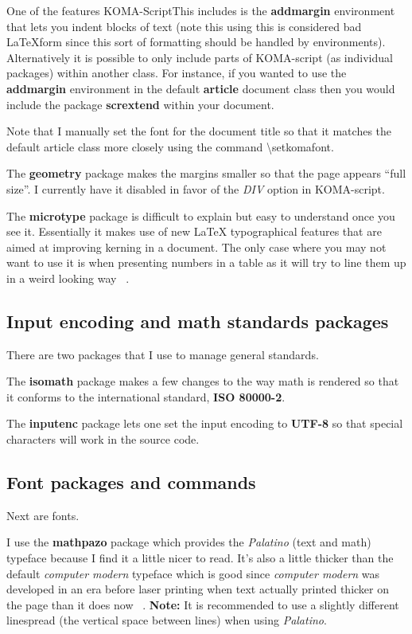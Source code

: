       One of the features KOMA-ScriptThis includes is the \textbf{addmargin} environment that lets you indent blocks of text (note this using this is considered bad \LaTeX form since this sort of formatting should be handled by environments). Alternatively it is possible to only include parts of KOMA-script (as individual packages) within another class. For instance, if you wanted to use the \textbf{addmargin} environment in the default \textbf{article} document class then you would include the package \textbf{scrextend} within your document.

      Note that I manually set the font for the document title so that it matches the default article class more closely using the command \textbackslash setkomafont.

      The \textbf{geometry} package makes the margins smaller so that the page appears ``full size''. I currently have it disabled in favor of the \textit{DIV} option in KOMA-script.

      The \textbf{microtype} package is difficult to explain but easy to understand once you see it. Essentially it makes use of new \LaTeX{} typographical features that are aimed at improving kerning in a document. The only case where you may not want to use it is when presenting numbers in a table as it will try to line them up in a weird looking way ~\cite{Khirevich}.

    \subsection{Input encoding and math standards packages}
      There are two packages that I use to manage general standards.

      The \textbf{isomath} package makes a few changes to the way math is rendered so that it conforms to the international standard, \textbf{ISO 80000-2}.

      The \textbf{inputenc} package lets one set the input encoding to \textbf{UTF-8} so that special characters will work in the source code.

    \subsection{Font packages and commands}
      Next are fonts.

      I use the \textbf{mathpazo} package which provides the \textit{Palatino} (text and math) typeface because I find it a little nicer to read. It's also a little thicker than the default \textit{computer modern} typeface which is good since \textit{computer modern} was developed in an era before laser printing when text actually printed thicker on the page than it does now ~\cite{fatmodern}. \textbf{Note:} It is recommended to use a slightly different linespread (the vertical space between lines) when using \textit{Palatino}.

